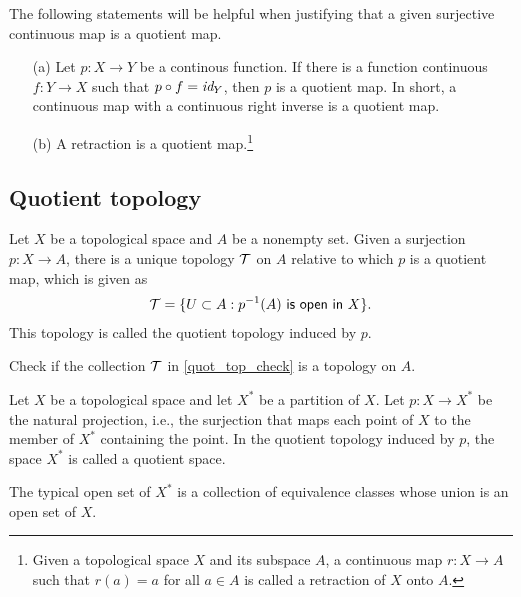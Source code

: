 The following statements will be helpful when justifying that a given surjective continuous map is a quotient map.
\begin{prop}
    \begin{enumerate}
        \item[(a)]
        {
            Let $p: X\rightarrow Y$ be a continous function.
            If there is a function continuous $f: Y\rightarrow X$ such that $p\circ f=\textit{id}_{Y}$, then $p$ is a quotient map.
            In short, a continuous map with a continuous right inverse is a quotient map.
        }
        \item[(b)]
        {
            A retraction is a quotient map.\footnote{Given a topological space $X$ and its subspace $A$, a continuous map $r: X\rightarrow A$ such that $r(a)=a$ for all $a\in A$ is called a retraction of $X$ onto $A$.}            
        }
    \end{enumerate}
\end{prop}

\subsection{Quotient topology}

\begin{defi}
    Let $X$ be a topological space and $A$ be a nonempty set.
    Given a surjection $p: X\rightarrow A$, there is a unique topology ${\mathcal{T}}$ on $A$ relative to which $p$ is a quotient map, which is given as
    \begin{align}\label{quot_top_check}
        {\mathcal{T}}=\{U\subset A: p^{-1}(A)\textsf{ is open in }X\}.
    \end{align}
    This topology is called the quotient topology induced by $p$.
\end{defi}
\begin{prob}
    Check if the collection ${\mathcal{T}}$ in \cref{quot_top_check} is a topology on $A$.
\end{prob}
\begin{defi}
    Let $X$ be a topological space and let $X^*$ be a partition of $X$.
    Let $p: X\rightarrow X^*$ be the natural projection, i.e., the surjection that maps each point of $X$ to the member of $X^*$ containing the point.
    In the quotient topology induced by $p$, the space $X^*$ is called a quotient space.
\end{defi}
\begin{rmk}
    The typical open set of $X^*$ is a collection of equivalence classes whose union is an open set of $X$.
\end{rmk}

